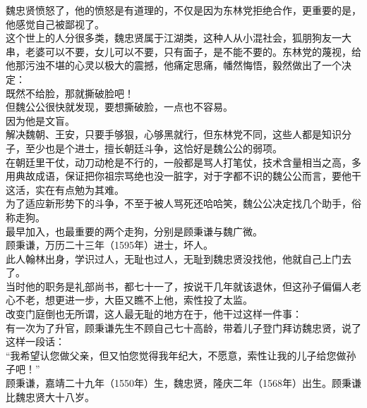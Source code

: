 \begin{multicols}{\theparacolNo}
魏忠贤愤怒了，他的愤怒是有道理的，不仅是因为东林党拒绝合作，更重要的是，他感觉自己被鄙视了。\\

这个世上的人分很多类，魏忠贤属于江湖类，这种人从小混社会，狐朋狗友一大串，老婆可以不要，女儿可以不要，只有面子，是不能不要的。东林党的蔑视，给他那污浊不堪的心灵以极大的震撼，他痛定思痛，幡然悔悟，毅然做出了一个决定：\\

既然不给脸，那就撕破脸吧！\\

但魏公公很快就发现，要想撕破脸，一点也不容易。\\

因为他是文盲。\\

解决魏朝、王安，只要手够狠，心够黑就行，但东林党不同，这些人都是知识分子，至少也是个进士，擅长朝廷斗争，这恰好是魏公公的弱项。\\

在朝廷里干仗，动刀动枪是不行的，一般都是骂人打笔仗，技术含量相当之高，多用典故成语，保证把你祖宗骂绝也没一脏字，对于字都不识的魏公公而言，要他干这活，实在有点勉为其难。\\

为了适应新形势下的斗争，不至于被人骂死还哈哈笑，魏公公决定找几个助手，俗称走狗。\\

最早加入，也最重要的两个走狗，分别是顾秉谦与魏广微。\\

顾秉谦，万历二十三年（1595年）进士，坏人。\\

此人翰林出身，学识过人，无耻也过人，无耻到魏忠贤没找他，他就自己上门去了。\\

当时他的职务是礼部尚书，都七十一了，按说干几年就该退休，但这孙子偏偏人老心不老，想更进一步，大臣又瞧不上他，索性投了太监。\\

改变门庭倒也无所谓，这人最无耻的地方在于，他干过这样一件事：\\

有一次为了升官，顾秉谦先生不顾自己七十高龄，带着儿子登门拜访魏忠贤，说了这样一段话：\\

“我希望认您做父亲，但又怕您觉得我年纪大，不愿意，索性让我的儿子给您做孙子吧！”\\

顾秉谦，嘉靖二十九年（1550年）生，魏忠贤，隆庆二年（1568年）出生。顾秉谦比魏忠贤大十八岁。\\


\end{multicols}
